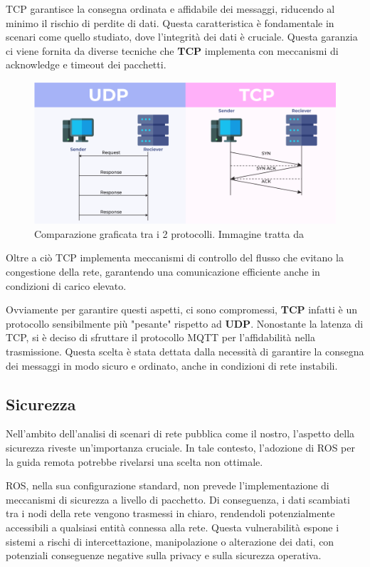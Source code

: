 \noindent TCP garantisce la consegna ordinata e affidabile dei messaggi, riducendo al minimo il rischio di perdite di dati. Questa caratteristica è fondamentale in scenari come quello studiato, dove l'integrità dei dati è cruciale. Questa garanzia ci viene fornita da diverse tecniche che \textbf{TCP} implementa con meccanismi di acknowledge e timeout dei pacchetti. 

\begin{figure}[H]
  \centering
  \includegraphics[width=1\textwidth]{figures/tcp_vs_udp_geeksforgeeks.png}
  \caption{Comparazione graficata tra i 2 protocolli. Immagine tratta da \cite{TCPvsUDP_geeksforgeeks}}
  \label{Comparazione graficata tra i 2 protocolli}
\end{figure}

\noindent Oltre a ciò TCP implementa meccanismi di controllo del flusso che evitano la congestione della rete, garantendo una comunicazione efficiente anche in condizioni di carico elevato.

\noindent Ovviamente per garantire questi aspetti, ci sono compromessi, \textbf{TCP} infatti è un protocollo sensibilmente più "pesante" rispetto ad \textbf{UDP}. Nonostante la latenza di TCP, si è deciso di sfruttare il protocollo MQTT per l'affidabilità nella trasmissione. Questa scelta è stata dettata dalla necessità di garantire la consegna dei messaggi in modo sicuro e ordinato, anche in condizioni di rete instabili.

\subsection{Sicurezza}
\noindent Nell'ambito dell'analisi di scenari di rete pubblica come il nostro, l'aspetto della sicurezza riveste un'importanza cruciale. In tale contesto, l'adozione di ROS per la guida remota potrebbe rivelarsi una scelta non ottimale.

\noindent ROS, nella sua configurazione standard, non prevede l'implementazione di meccanismi di sicurezza a livello di pacchetto. Di conseguenza, i dati scambiati tra i nodi della rete vengono trasmessi in chiaro, rendendoli potenzialmente accessibili a qualsiasi entità connessa alla rete. Questa vulnerabilità espone i sistemi a rischi di intercettazione, manipolazione o alterazione dei dati, con potenziali conseguenze negative sulla privacy e sulla sicurezza operativa.


